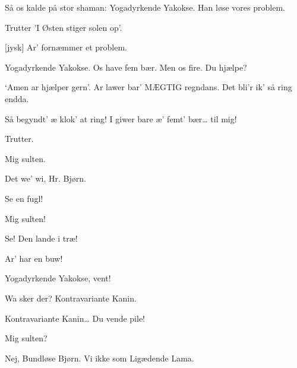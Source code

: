 \documentclass[a4paper,11pt]{article}
\begin{document}
\begin{sketch}
 Så os kalde på stor shaman: Yogadyrkende Yakokse. Han løse vores problem.


 Trutter 'I Østen stiger solen op'. 


 [jysk] Ar’ fornæmmer et problem. 

 Yogadyrkende Yakokse. Os have fem bær. Men os fire. Du hjælpe?

 ‘Amen ar hjælper gern’. Ar lawer bar’ MÆGTIG regndans. Det bli’r ik’ så ring endda.


 Så begyndt’ æ klok’ at ring! I giwer bare æ’ femt’ bær… til mig!


 Trutter.


 Mig sulten.

 Det we’ wi, Hr. Bjørn.


 Se en fugl!

 Mig sulten!

 Se! Den lande i træ!


 Ar’ har en buw! 


 Yogadyrkende Yakokse, vent!

 Wa sker der? Kontravariante Kanin.


 Kontravariante Kanin… Du vende pile!


 Mig sulten?

 Nej, Bundløse Bjørn. Vi ikke som Ligædende Lama. 


\end{sketch}
\end{document}
